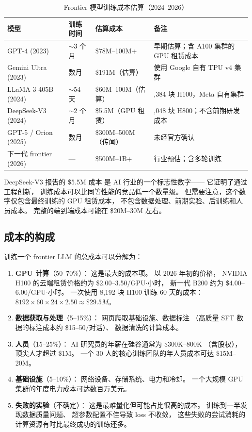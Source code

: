 \begin{table}[H]
\centering\small
\renewcommand{\arraystretch}{1.3}
\caption{Frontier 模型训练成本估算（2024--2026）}\label{tab:training-costs}
\begin{tabularx}{\linewidth}{l l l >{\raggedright\arraybackslash}X}
\toprule
\rowcolor{figLightGray}
\textbf{模型} & \textbf{训练时间} & \textbf{估算成本} & \textbf{备注} \\
\midrule
GPT-4 (2023) & $\sim$3 个月 & \$78M--100M+ &
  早期估算；含 A100 集群的 GPU 租赁成本 \\
Gemini Ultra (2023) & 数月 & \$191M（估算） &
  使用 Google 自有 TPU v4 集群 \\
LLaMA 3 405B (2024) & $\sim$54 天 & \$60M--100M（估算） &
  16,384 块 H100，Meta 自有集群 \\
DeepSeek-V3 (2024) & $\sim$2 个月 & \$5.5M（GPU 租赁） &
  2,048 块 H800；不含前期研发成本 \\
GPT-5 / Orion (2025) & 数月 & \$300M--500M（传闻） &
  未经官方确认 \\
下一代 frontier (2026) & --- & \$500M--1B+ &
  行业预估；含多轮训练 \\
\bottomrule
\end{tabularx}
\end{table}

DeepSeek-V3 报告的 \$5.5M 成本
是 AI 行业的一个标志性数字——
它证明了通过工程创新，
训练成本可以比同等性能的竞品低一个数量级。
但需要注意，这个数字仅包含最终训练的 GPU 租赁成本，
不包含数据处理、前期实验、后训练和人员成本。
完整的端到端成本可能在 \$20M--30M 左右。

\subsection{成本的构成}

训练一个 frontier LLM 的总成本可以分解为：

\begin{enumerate}[noitemsep]
  \item \textbf{GPU 计算}（50--70\%）：
        这是最大的成本项。
        以 2026 年初的价格，
        NVIDIA H100 的云端租赁价格约为 \$2.00--3.50/GPU$\cdot$小时，
        新一代 B200 约为 \$4.00--6.00/GPU$\cdot$小时。
        一次使用 8,192 块 H100 训练 60 天的成本：
        $8192 \times 60 \times 24 \times 2.50 \approx \$29.5M$。
  \item \textbf{数据获取与处理}（5--15\%）：
        网页爬取基础设施、数据标注
        （高质量 SFT 数据的标注成本约 \$15--50/对话）、
        数据清洗的计算成本。
  \item \textbf{人员}（15--25\%）：
        AI 研究员的年薪在硅谷通常为 \$300K--800K
        （含股权），顶尖人才超过 \$1M。
        一个 30 人的核心训练团队的年人员成本可达 \$15M--20M。
  \item \textbf{基础设施}（5--10\%）：
        网络设备、存储系统、电力和冷却。
        一个大规模 GPU 集群的年度电力成本可达数百万美元。
  \item \textbf{失败的实验}（不确定）：
        这是最难量化但可能占比很高的成本。
        训练到一半发现数据质量问题、
        超参数配置不佳导致 loss 不收敛，
        这些失败的尝试消耗的计算资源有时比最终成功的训练还多。
\end{enumerate}

